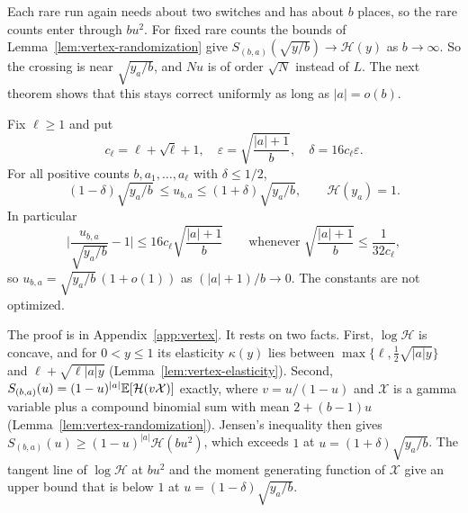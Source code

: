 Each rare run again needs about two switches and has about $b$ places, so the
rare counts enter through $bu^2$. For fixed rare counts the bounds of
Lemma~\ref{lem:vertex-randomization} give $S_{(b,a)}(\sqrt{y/b})\to\mathcal H(y)$
as $b\to\infty$. So the crossing is near $\sqrt{y_a/b}$, and $Nu$ is of order
$\sqrt N$ instead of $L$. The next theorem shows that this stays correct
uniformly as long as $|a|=o(b)$.

\begin{theorem}
\label{thm:vertex-uniform-root}
Fix $\ell\ge1$ and put
\[
 c_\ell=\ell+\sqrt\ell+1,\quad
 \varepsilon=\sqrt{\frac{|a|+1}{b}},\quad \delta=16c_\ell\varepsilon.
\]
For all positive counts $b,a_1,\ldots,a_\ell$ with $\delta\le1/2$,
\begin{equation}\label{eq:vertex-uniform-bracket}
 (1-\delta)\sqrt{y_a/b}\ \le u_{b,a}\le
 (1+\delta)\sqrt{y_a/b},\qquad \mathcal H(y_a)=1.
\end{equation}
In particular
\begin{equation}\label{eq:vertex-uniform-root}
 \biggl|\frac{u_{b,a}}{\sqrt{y_a/b}}-1\biggr|\le16c_\ell\sqrt{\frac{|a|+1}{b}}
 \qquad\text{whenever }\sqrt{\frac{|a|+1}{b}}\le\frac1{32c_\ell},
\end{equation}
so $u_{b,a}=\sqrt{y_a/b}\,(1+o(1))$ as $(|a|+1)/b\to0$. The constants are not
optimized.
\end{theorem}

The proof is in Appendix~\ref{app:vertex}. It rests on two facts.
First, $\log\mathcal H$ is concave, and for $0<y\le1$ its elasticity $\kappa(y)$
lies between $\max\{\ell,\frac12\sqrt{|a|y}\}$ and $\ell+\sqrt{\ell|a|y}$
(Lemma~\ref{lem:vertex-elasticity}). Second,
$S_{(b,a)}(u)=(1-u)^{|a|}\mathbb E[\mathcal H(v\mathcal X)]$ exactly, where
$v=u/(1-u)$ and $\mathcal X$ is a gamma variable plus a compound binomial sum
with mean $2+(b-1)u$ (Lemma~\ref{lem:vertex-randomization}). Jensen's
inequality then gives $S_{(b,a)}(u)\ge(1-u)^{|a|}\mathcal H(bu^2)$, which
exceeds $1$ at $u=(1+\delta)\sqrt{y_a/b}$. The tangent line of $\log\mathcal H$
at $bu^2$ and the moment generating function of $\mathcal X$ give an upper bound
that is below $1$ at $u=(1-\delta)\sqrt{y_a/b}$.
